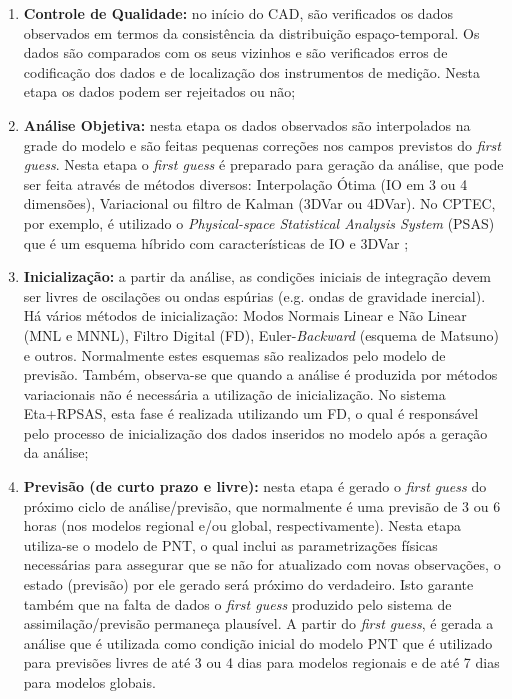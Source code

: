 \begin{enumerate}
\item \textbf{Controle de Qualidade:} no início do CAD, são verificados os dados observados em termos da consistência da distribuição espaço-temporal. Os dados são comparados com os seus vizinhos e são verificados erros de codificação dos dados e de localização dos instrumentos de medição. Nesta etapa os dados podem ser rejeitados ou não;
\item \textbf{Análise Objetiva:} nesta etapa os dados observados são interpolados na grade do modelo e são feitas pequenas correções nos campos previstos do \textit{first guess}. Nesta etapa o \textit{first guess} é preparado para geração da análise, que pode ser feita através de métodos diversos: Interpolação Ótima (IO em 3 ou 4 dimensões), Variacional ou filtro de Kalman (3DVar ou 4DVar). No CPTEC, por exemplo, é utilizado o \textit{Physical-space Statistical Analysis System} (PSAS) que é um esquema híbrido com características de IO e 3DVar \cite{courtieretal98};
\item \textbf{Inicialização:} a partir da análise, as condições iniciais de integração devem ser livres de oscilações ou ondas espúrias (e.g. ondas de gravidade inercial). Há vários métodos de inicialização: Modos Normais Linear e Não Linear (MNL e MNNL), Filtro Digital (FD), Euler-\textit{Backward} (esquema de Matsuno) e outros. Normalmente estes esquemas são realizados pelo modelo de previsão. Também, observa-se que quando a análise é produzida por métodos variacionais não é necessária a utilização de inicialização. No sistema Eta+RPSAS, esta fase é realizada utilizando um FD, o qual é responsável pelo processo de inicialização dos dados inseridos no modelo após a geração da análise;
\item \textbf{Previsão (de curto prazo e livre):} nesta etapa é gerado o \textit{first guess} do próximo ciclo de análise/previsão, que normalmente é uma previsão de 3 ou 6 horas (nos modelos regional e/ou global, respectivamente). Nesta etapa utiliza-se o modelo de PNT, o qual inclui as parametrizações físicas necessárias para assegurar que se não for atualizado com novas observações, o estado (previsão) por ele gerado será próximo do verdadeiro. Isto garante também que na falta de dados o \textit{first guess} produzido pelo sistema de assimilação/previsão permaneça plausível. A partir do \textit{first guess}, é gerada a análise que é utilizada como condição inicial do modelo PNT que é utilizado para previsões livres de até 3 ou 4 dias para modelos regionais e de até 7 dias para modelos globais.
\end{enumerate}
